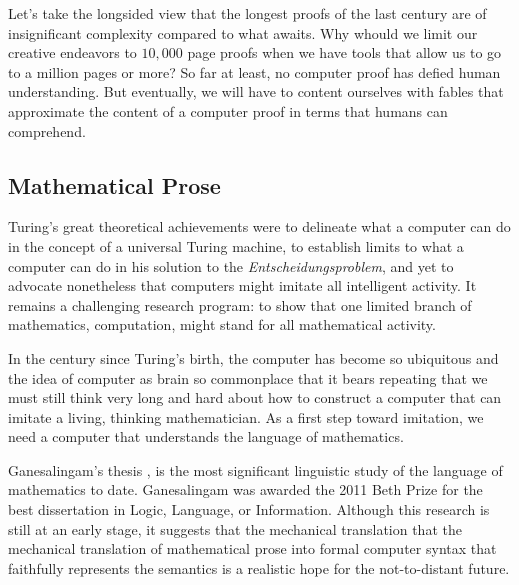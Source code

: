 \documentclass{llncs}
\begin{document}
Let's take the longsided view that the longest proofs of the last century 
are of insignificant complexity compared to what awaits.
Why whould we limit our creative endeavors to $10,000$ page proofs when we have tools
that allow us to go to a million pages or more?  So far at least, no computer proof
has defied human understanding.  But eventually, we will have to content ourselves
with fables that approximate the content of a computer proof in terms that humans
can comprehend.




\subsection{Mathematical Prose}

Turing's great theoretical achievements were to delineate what a
computer can do in the concept of a universal Turing machine, to
establish limits to what a computer can do in his solution to the {\it
  Entscheidungsproblem}, and yet to advocate nonetheless that
computers might imitate all intelligent activity. It remains a
challenging research program:
to show
that one limited branch of mathematics, computation, might stand for
all mathematical activity.

In the century since Turing's birth, the computer has become so
ubiquitous and the idea of computer as brain so commonplace that it
bears repeating that we must still think very long and hard about how
to construct a computer that can imitate a living, thinking
mathematician.  As a first step toward imitation, we need a computer
that understands the language of mathematics.


\bigskip

Ganesalingam's thesis \cite{Gan09}, \cite{Gan10} is the most
significant linguistic study of the language of mathematics to date.
Ganesalingam was awarded the 2011 Beth Prize for the best dissertation
in Logic, Language, or Information.  Although this research is still
at an early stage, it suggests that the mechanical
translation that the mechanical translation of mathematical prose into
formal computer syntax that faithfully represents the semantics is a
realistic hope for the not-to-distant future.

\end{document}
